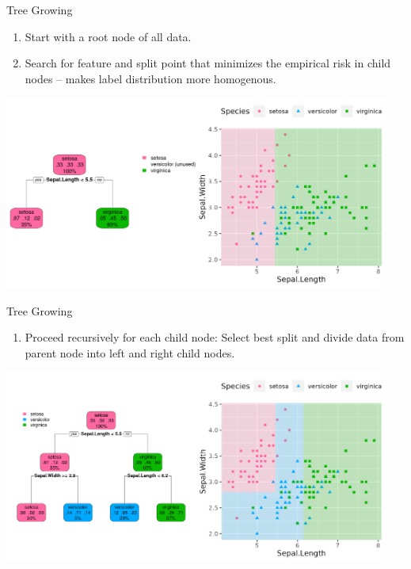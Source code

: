\documentclass[11pt,compress,t,notes=noshow, xcolor=table]{beamer}
\begin{document}
\begin{vbframe}{Tree Growing}

\begin{enumerate}
\item Start with a root node of all data.
\item Search for feature and split point that minimizes the empirical risk in child nodes --  makes label distribution more homogenous.
\end{enumerate}

\color{fgcolor}

{\centering \includegraphics[width=0.95\textwidth]{figure/tree-classif-depth1.pdf} 

}

\end{vbframe}

\begin{vbframe}{Tree Growing}

\begin{enumerate}[3]
\item Proceed recursively for each child node:
Select best split and divide data from parent node into left and right child nodes.
\end{enumerate}

\color{fgcolor}

{\centering \includegraphics[width=0.95\textwidth]{figure/tree-classif-depth2.pdf} 

}

\end{vbframe}
\end{document}
